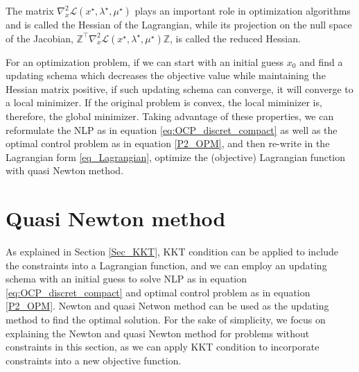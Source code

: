 \documentclass  [
  paper    = a4,
  BCOR     = 10mm,
  twoside,
  fontsize = 12pt,
  fleqn,
  toc      = bibnumbered,
  toc      = listofnumbered,
  numbers  = noendperiod,
  headings = normal,
  listof   = leveldown,
  version  = 3.03
]                                       {scrreprt}
\newcommand{\<}{\langle}
\renewcommand{\>}{\rangle}
\begin{document}
The matrix $\nabla_x^2 \mathcal{L}(x^\star, \lambda^\star, \mu^\star)$ plays an important role in optimization algorithms and is called the Hessian of the Lagrangian, while its projection on the null space of the Jacobian, $\mathbb{Z}^\top \nabla_x^2 \mathcal{L}(x^\star, \lambda^\star, \mu^\star)\mathbb{Z}$, is called the reduced Hessian. 

For an optimization problem, if we can start with an initial guess $x_0$ and find a updating schema which decreases the objective value while maintaining the Hessian matrix positive, if such updating schema can converge, it will converge to a local minimizer. If the original problem is convex, the local miminizer is, therefore, the global minimizer. Taking advantage of these properties, we can reformulate the NLP as in equation \ref{eq:OCP_discret_compact} as well as the optimal control problem as in equation \ref{P2_OPM}, and then re-write in the Lagrangian form \ref{eq_Lagrangian}, optimize the (objective) Lagrangian function with quasi Newton method. 




\section{Quasi Newton method}

As explained in Section \ref{Sec_KKT}, KKT condition can be applied to include the constraints into a Lagrangian function, and we can employ an updating schema with an initial guess to solve NLP as in equation \ref{eq:OCP_discret_compact} and optimal control problem as in equation \ref{P2_OPM}. Newton and quasi Netwon method can be used as the updating method to find the optimal solution. 
For the sake of simplicity, we focus on explaining the Newton and quasi Newton method for problems without constraints in this section, as we can apply KKT condition to incorporate constraints into a new objective function.
\end{document}
